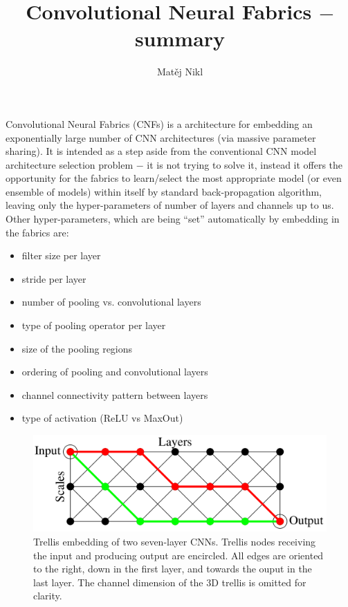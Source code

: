 \documentclass[a4paper,twocolumn]{article}
\title{Convolutional Neural Fabrics $-$ summary}
\author{Matěj Nikl}
\begin{document}
\maketitle
Convolutional Neural Fabrics (CNFs) is a architecture for embedding an exponentially large number of CNN architectures (via massive parameter sharing). It is intended as a step aside from the conventional CNN model architecture selection problem $-$  it is not trying to solve it, instead it offers the opportunity for the fabrics to learn/select the most appropriate model (or even ensemble of models) within itself by standard back-propagation algorithm, leaving only the hyper-parameters of number of layers and channels up to us.
Other hyper-parameters, which are being ``set'' automatically by embedding in the fabrics are:
\begin{itemize}
    \item filter size per layer
    \item stride per layer
    \item number of pooling vs. convolutional layers
    \item type of pooling operator per layer
    \item size of the pooling regions
    \item ordering of pooling and convolutional layers
    \item channel connectivity pattern between layers
    \item type of activation (ReLU vs MaxOut)
\end{itemize}


\begin{figure}[!h]
    \includegraphics[width=\columnwidth]{fabrics1.png}
    \caption{Trellis embedding of two seven-layer CNNs. Trellis nodes receiving the input and producing output are encircled. All edges are oriented to the right, down in the first layer, and towards the ouput in the last layer. The channel dimension of the 3D trellis is omitted for clarity.}
\end{figure}
\end{document}
